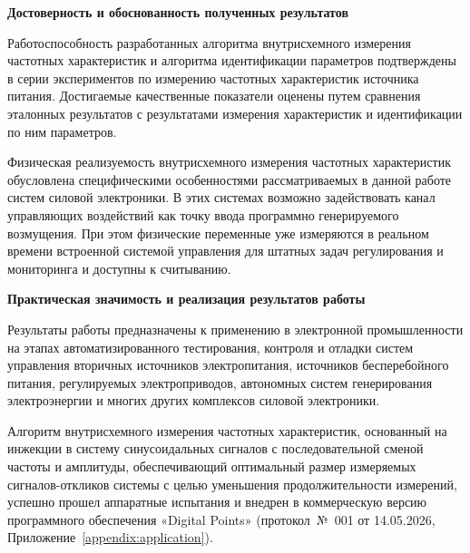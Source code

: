 \textbf{Достоверность и обоснованность полученных результатов}\par
Работоспособность разработанных алгоритма внутрисхемного измерения частотных характеристик и алгоритма идентификации параметров подтверждены в серии экспериментов по измерению частотных характеристик источника питания. Достигаемые качественные показатели оценены путем сравнения эталонных результатов с результатами измерения характеристик и идентификации по ним параметров.

Физическая реализуемость внутрисхемного измерения частотных характеристик обусловлена специфическими особенностями рассматриваемых в данной работе систем силовой электроники. В этих системах возможно задействовать канал управляющих воздействий как точку ввода программно генерируемого возмущения. При этом физические переменные уже измеряются в реальном времени встроенной системой управления для штатных задач регулирования и мониторинга и доступны к считыванию.

\textbf{Практическая значимость и реализация результатов работы}\par
Результаты работы предназначены к применению в электронной промышленности на этапах автоматизированного тестирования, контроля и отладки систем управления вторичных источников электропитания, источников бесперебойного питания, регулируемых электроприводов, автономных систем генерирования электроэнергии и многих других комплексов силовой электроники.

Алгоритм внутрисхемного измерения частотных характеристик, основанный на инжекции в систему синусоидальных сигналов с последовательной сменой частоты и амплитуды, обеспечивающий оптимальный размер измеряемых сигналов-откликов системы с целью уменьшения продолжительности измерений, успешно прошел аппаратные испытания и внедрен в коммерческую версию программного обеспечения «Digital Points» (протокол~№~001 от 14.05.2026, Приложение~\ref{appendix:application}).

